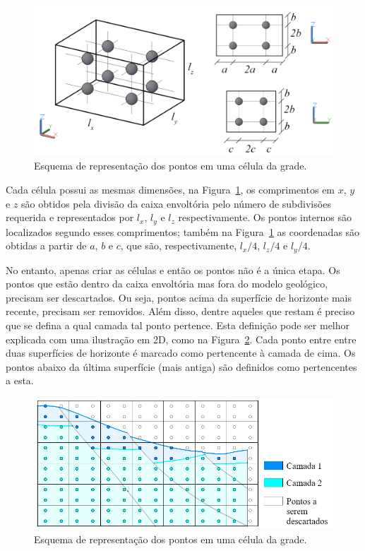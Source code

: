 \begin{figure} [H]
  \begin{center}
    \includegraphics[width=\textwidth]{images/fig-vol-cell}
    \caption{Esquema de representação dos pontos em uma célula da grade.}\label{fig-vol-cell}
  \end{center}
\end{figure}

Cada célula possui as mesmas dimensões, na Figura~\ref{fig-vol-cell}, os comprimentos em $x$, $y$ e $z$ são obtidos pela divisão da caixa envoltória pelo número de subdivisões requerida e representados por $l_x$, $l_y$ e $l_z$ respectivamente. Os pontos internos são localizados segundo esses comprimentos; também na Figura~\ref{fig-vol-cell} as coordenadas são obtidas a partir de $a$, $b$ e $c$, que são, respectivamente, $l_x/4$, $l_z/4$ e $l_y/4$.

No entanto, apenas criar as células e então os pontos não é a única etapa. Os pontos que estão dentro da caixa envoltória mas fora do modelo geológico, precisam ser descartados. Ou seja, pontos acima da superfície de horizonte mais recente, precisam ser removidos. Além disso, dentre aqueles que restam é preciso que se defina a qual camada tal ponto pertence. Esta definição pode ser melhor explicada com uma ilustração em 2D, como na Figura~\ref{fig-vol-2d}. Cada ponto entre entre duas superfícies de horizonte é marcado como pertencente à camada de cima. Os pontos abaixo da última superfície (mais antiga) são definidos como pertencentes a esta.

\begin{figure} [H]
  \begin{center}
    \includegraphics[width=\textwidth]{images/fig-vol-2d}
    \caption{Esquema de representação dos pontos em uma célula da grade.}\label{fig-vol-2d}
  \end{center}
\end{figure}

